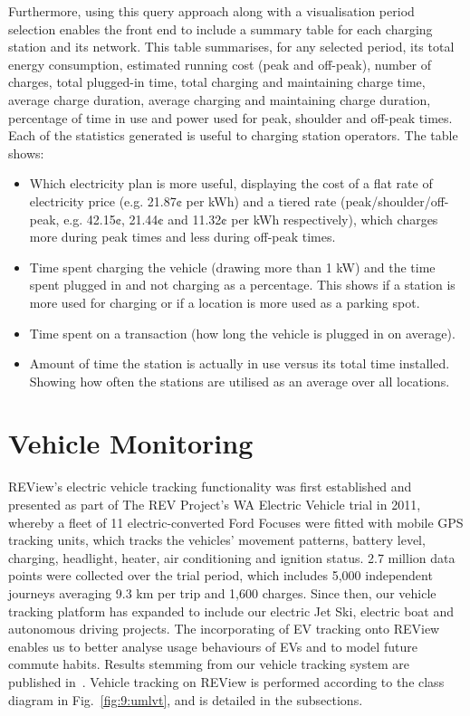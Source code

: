 Furthermore, using this query approach along with a visualisation period selection enables the front end to include a summary table for each charging station and its network. This table summarises, for any selected period, its total energy consumption, estimated running cost (peak and off-peak), number of charges, total plugged-in time, total charging and maintaining charge time, average charge duration, average charging and maintaining charge duration, percentage of time in use and power used for peak, shoulder and off-peak times. Each of the statistics generated is useful to charging station operators.  The table shows:
\begin{itemize}
	\item Which electricity plan is more useful, displaying the cost of a flat rate of electricity price (e.g. 21.87¢ per kWh) and a tiered rate (peak/shoulder/off-peak, e.g. 42.15¢, 21.44¢ and 11.32¢ per kWh respectively), which charges more during peak times and less during off-peak times.
	\item Time spent charging the vehicle (drawing more than 1 kW) and the time spent plugged in and not charging as a percentage. This shows if a station is more used for charging or if a location is more used as a parking spot. 
	\item Time spent on a transaction (how long the vehicle is plugged in on average).
	\item Amount of time the station is actually in use versus its total time installed. Showing how often the stations are utilised as an average over all locations.
\end{itemize}

\section{Vehicle Monitoring}
\label{sec:9:vm}
REView’s electric vehicle tracking functionality was first established and presented as part of The REV Project’s WA Electric Vehicle trial in 2011, whereby a fleet of 11 electric-converted Ford Focuses were fitted with mobile GPS tracking units, which tracks the vehicles’ movement patterns, battery level, charging, headlight, heater, air conditioning and ignition status. 2.7 million data points were collected over the trial period, which includes 5,000 independent journeys averaging 9.3 km per trip and 1,600 charges. Since then, our vehicle tracking platform has expanded to include our electric Jet Ski, electric boat and autonomous driving projects. The incorporating of EV tracking onto REView enables us to better analyse usage behaviours of EVs and to model future commute habits. Results stemming from our vehicle tracking system are published in~\cite{speidel_analysis_2012}. Vehicle tracking on REView is performed according to the class diagram in Fig.~\ref{fig:9:umlvt}, and is detailed in the subsections.

